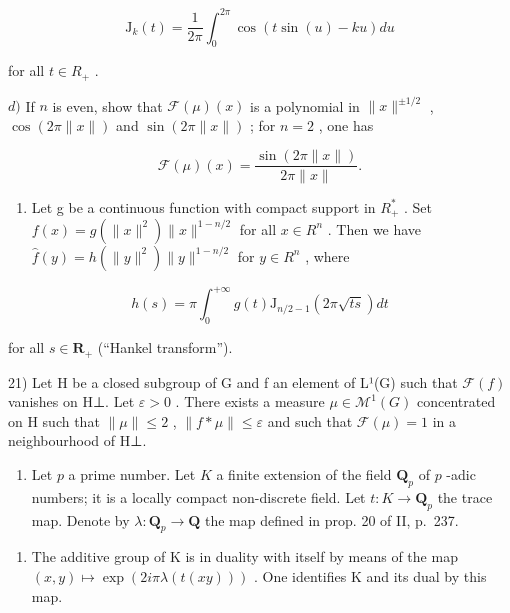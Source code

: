 \[
\mathrm{J} _ {k} (t) = \frac {1}{2 \pi} \int_ {0} ^ {2 \pi} \cos (t \sin (u) - k u) d u
\]

for all \(t \in R_{+}\) .

\(d)\) If \(n\) is even, show that \(\mathcal{F}(\mu)(x)\) is a polynomial in \(\| x\|^{\pm 1/2}\) , \(\cos(2\pi \| x\|)\) and \(\sin(2\pi \| x\|)\) ; for \(n=2\) , one has

\[
\mathcal {F} (\mu) (x) = \frac {\sin (2 \pi \| x \|)}{2 \pi \| x \|}.
\]

\begin{enumerate}
\def\labelenumi{\alph{enumi})}
\setcounter{enumi}{4}
\tightlist
\item
  Let g be a continuous function with compact support in \(R_{+}^{*}\) . Set \(f(x) = g(\|x\|^{2}) \|x\|^{1-n/2}\) for all \(x \in R^{n}\) . Then we have \(\widehat{f}(y) = h(\|y\|^{2}) \|y\|^{1-n/2}\) for \(y \in R^{n}\) , where
\end{enumerate}

\[
h (s) = \pi \int_ {0} ^ {+ \infty} g (t) \mathrm{J} _ {n / 2 - 1} (2 \pi \sqrt {t s}) d t
\]

for all \(s \in \mathbf{R}_{+}\) (“Hankel transform”).

21) Let H be a closed subgroup of G and f an element of L¹(G) such that \(\mathcal{F}(f)\) vanishes on H⊥. Let \(\varepsilon > 0\) . There exists a measure \(\mu \in \mathcal{M}^1(G)\) concentrated on H such that \(\| \mu \| \leqslant 2\) , \(\| f * \mu \| \leqslant \varepsilon\) and such that \(\mathcal{F}(\mu) = 1\) in a neighbourhood of H⊥.

\begin{enumerate}
\def\labelenumi{\arabic{enumi})}
\setcounter{enumi}{21}
\tightlist
\item
  Let \(p\) a prime number. Let \(K\) a finite extension of the field \(\mathbf{Q}_p\) of \(p\) -adic numbers; it is a locally compact non-discrete field. Let \(t: K \to \mathbf{Q}_p\) the trace map. Denote by \(\lambda: \mathbf{Q}_p \to \mathbf{Q}\) the map defined in prop. 20 of II, p.~237.
\end{enumerate}

\begin{enumerate}
\def\labelenumi{\alph{enumi})}
\tightlist
\item
  The additive group of K is in duality with itself by means of the map \((x,y)\mapsto\exp(2i\pi\lambda(t(xy)))\) . One identifies K and its dual by this map.
\end{enumerate}

